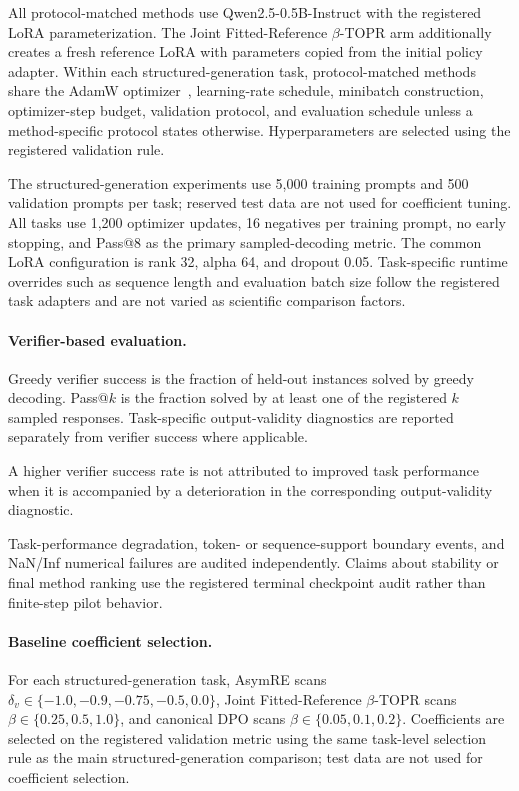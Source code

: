 \documentclass{article}
\theoremstyle{plain}
\theoremstyle{definition}
\theoremstyle{remark}
\begin{document}
All protocol-matched methods use Qwen2.5-0.5B-Instruct
\citep{qwen2024qwen25} with the registered LoRA parameterization. The
Joint Fitted-Reference \(\beta\)-TOPR arm additionally creates a fresh
reference LoRA with parameters copied from the initial policy adapter.
Within each structured-generation task, protocol-matched methods share the
AdamW optimizer~\citep{loshchilov2019decoupled}, learning-rate schedule,
minibatch construction, optimizer-step budget, validation protocol, and
evaluation schedule unless a method-specific protocol states otherwise.
Hyperparameters are selected using the registered validation rule.

The structured-generation experiments use 5,000 training prompts and
500 validation prompts per task; reserved test data are not used for
coefficient tuning. All tasks use 1,200 optimizer updates, 16 negatives per
training prompt, no early stopping, and Pass@8 as the primary sampled-decoding
metric. The common LoRA configuration is rank 32, alpha 64, and dropout 0.05.
Task-specific runtime overrides such as sequence length and evaluation batch
size follow the registered task adapters and are not varied as scientific
comparison factors.

\paragraph{Verifier-based evaluation.}

Greedy verifier success is the fraction of held-out instances solved by
greedy decoding. Pass@$k$ is the fraction solved by at least one of
the registered \(k\) sampled responses. Task-specific output-validity
diagnostics are reported separately from verifier success where applicable.

A higher verifier success rate is not attributed to improved task
performance when it is accompanied by a deterioration in the corresponding
output-validity diagnostic.

Task-performance degradation, token- or sequence-support boundary
events, and NaN/Inf numerical failures are audited independently.
Claims about stability or final method ranking use the registered
terminal checkpoint audit rather than finite-step pilot behavior.


\paragraph{Baseline coefficient selection.}
For each structured-generation task, AsymRE scans
\(\delta_v\in\{-1.0,-0.9,-0.75,-0.5,0.0\}\), Joint Fitted-Reference
\(\beta\)-TOPR scans \(\beta\in\{0.25,0.5,1.0\}\), and canonical DPO
scans \(\beta\in\{0.05,0.1,0.2\}\). Coefficients are selected on the
registered validation metric using the same task-level selection rule as the
main structured-generation comparison; test data are not used for coefficient
selection.
\end{document}
